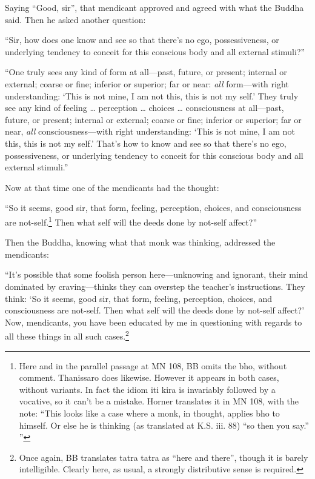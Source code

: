 \documentclass[12pt,openany]{book}%
\begin{document}
Saying “Good, sir”, that mendicant approved and agreed with what the Buddha said. Then he asked another question: 

“Sir, how does one know and see so that there’s no ego, possessiveness, or underlying tendency to conceit for this conscious body and all external stimuli?” 

“One truly sees any kind of form at all—past, future, or present; internal or external; coarse or fine; inferior or superior; far or near: \emph{all} form—with right understanding: ‘This is not mine, I am not this, this is not my self.’ They truly see any kind of feeling … perception … choices … consciousness at all—past, future, or present; internal or external; coarse or fine; inferior or superior; far or near, \emph{all} consciousness—with right understanding: ‘This is not mine, I am not this, this is not my self.’ That’s how to know and see so that there’s no ego, possessiveness, or underlying tendency to conceit for this conscious body and all external stimuli.” 

Now at that time one of the mendicants had the thought: 

“So it seems, good sir, that form, feeling, perception, choices, and consciousness are not-self.\footnote{Here and in the parallel passage at MN 108, BB omits the bho, without comment. Thanissaro does likewise. However it appears in both cases, without variants. In fact the idiom iti kira is invariably followed by a vocative, so it can’t be a mistake. Horner translates it in MN 108, with the note: “This looks like a case where a monk, in thought, applies bho to himself. Or else he is thinking (as translated at K.S. iii. 88) “so then you say.” ” } Then what self will the deeds done by not-self affect?” 

Then the Buddha, knowing what that monk was thinking, addressed the mendicants: 

“It’s possible that some foolish person here—unknowing and ignorant, their mind dominated by craving—thinks they can overstep the teacher’s instructions. They think: ‘So it seems, good sir, that form, feeling, perception, choices, and consciousness are not-self. Then what self will the deeds done by not-self affect?’ Now, mendicants, you have been educated by me in questioning with regards to all these things in all such cases.\footnote{Once again, BB translates tatra tatra as “here and there”, though it is barely intelligible. Clearly here, as usual, a strongly distributive sense is required. } 
\end{document}
